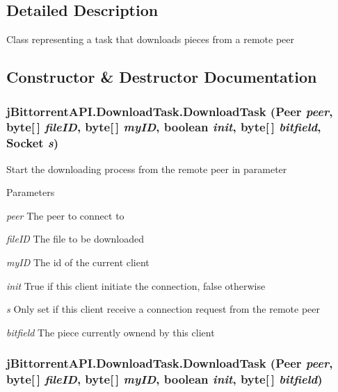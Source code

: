 \subsection{Detailed Description}
Class representing a task that downloads pieces from a remote peer 

\subsection{Constructor \& Destructor Documentation}
\hypertarget{classj_bittorrent_a_p_i_1_1_download_task_a9df91103ea2899e6d56ed0d4bbb91c50}{
\subsubsection[{DownloadTask}]{\setlength{\rightskip}{0pt plus 5cm}jBittorrentAPI.DownloadTask.DownloadTask ({\bf Peer} {\em peer}, \/  byte\mbox{[}$\,$\mbox{]} {\em fileID}, \/  byte\mbox{[}$\,$\mbox{]} {\em myID}, \/  boolean {\em init}, \/  byte\mbox{[}$\,$\mbox{]} {\em bitfield}, \/  Socket {\em s})}}
\label{classj_bittorrent_a_p_i_1_1_download_task_a9df91103ea2899e6d56ed0d4bbb91c50}
Start the downloading process from the remote peer in parameter 
\begin{DoxyParams}{Parameters}
\item[{\em peer}]The peer to connect to \item[{\em fileID}]The file to be downloaded \item[{\em myID}]The id of the current client \item[{\em init}]True if this client initiate the connection, false otherwise \item[{\em s}]Only set if this client receive a connection request from the remote peer \item[{\em bitfield}]The piece currently ownend by this client \end{DoxyParams}
\hypertarget{classj_bittorrent_a_p_i_1_1_download_task_a32181ebfc1d30259b58847cd6ffb527b}{
\subsubsection[{DownloadTask}]{\setlength{\rightskip}{0pt plus 5cm}jBittorrentAPI.DownloadTask.DownloadTask ({\bf Peer} {\em peer}, \/  byte\mbox{[}$\,$\mbox{]} {\em fileID}, \/  byte\mbox{[}$\,$\mbox{]} {\em myID}, \/  boolean {\em init}, \/  byte\mbox{[}$\,$\mbox{]} {\em bitfield})}}

